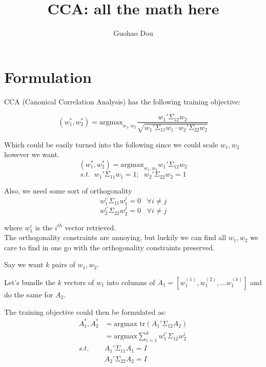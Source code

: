 \documentclass[12pt]{article}
\begin{document}
 
 
\title{CCA: all the math here}%
\author{Guohao Dou} %
 
\maketitle

\section{Formulation}

CCA (Canonical Correlation Analysis) has the following training objective:

\[(w_1^*, w_2^*) = \text{argmax}_{w_1, w_2}
    \frac{w_1'\Sigma_{12}w_2}
    {\sqrt{w_1'\Sigma_{11}w_1\cdot w_2'\Sigma_{22}w_2}}\]

Which could be easily turned into the following since we could scale $w_1, w_2$ however we want.
\[(w_1^*, w_2^*) = \text{argmax}_{w_1, w_2}w_1'\Sigma_{12}w_2\]
\[s.t.\;\; w_1'\Sigma_{11}w_1 = 1;\;\; w_2'\Sigma_{22}w_2 = 1\]

Also, we need some sort of orthogonality
\[w_1^{i'} \Sigma_{11} w_1^j = 0\;\;\; \forall i\neq j\]
\[w_2^{i'} \Sigma_{22} w_2^j = 0\;\;\; \forall i\neq j\]

where $w_1^i$ is the $i^{th}$ vector retrieved.\\

The orthogonality constraints are annoying, but luckily we can find all $w_1, w_2$ we care to find in one go with the orthogonality constraints preserved. 

Say we want $k$ pairs of $w_1, w_2$.

Let's bundle the $k$ vectors of $w_1$ into columns of $A_1 = [w_1^{(1)}, w_1^{(2)}, ...w_1^{(k)}]$ and do the same for $A_2$. 

The training objective could then be formulated as:
\begin{align*}
    A_1^*, A_2^* &= \text{argmax tr}(A_1'\Sigma_{12}A_2)\\
                 &= \text{argmax} \sum_{i=1}^{k} w_1^{i'} \Sigma_{12} w_2^{i}\\
    s.t.\;\; &A_1'\Sigma_{11}A_1 = I\\
        &A_2'\Sigma_{22}A_2 = I
\end{align*}
\newpage
\end{document}
